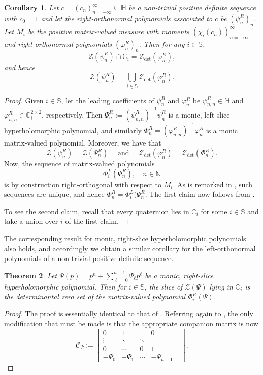 \documentclass[11pt,reqno]{amsart}
\def\x{\chi}
\def\p{\varphi}
\def\q{\psi}
\def\P{\Phi}
\def\Q{\Psi}
\def\NN{\mathbb{N}}
\def\CC{\mathbb{C}}
\def\SS{\mathbb{S}}
\def\HH{\mathbb{H}}
\def\cC{\mathcal{C}}
\def\cZ{\mathcal{Z}}
\newtheorem{theorem}{Theorem}[section]
\newtheorem{corollary}[theorem]{Corollary}
\theoremstyle{definition}
\numberwithin{equation}{section}
\begin{document}
\begin{corollary}
    \label{cor:rightPolyZeros}
    Let \(c = (c_n)_{n=-\infty}^{\infty} \subseteq \HH\) be a non-trivial positive definite sequence with \(c_0 = 1\) and let the right-orthonormal polynomials associated to \(c\) be \((\q_n^R)_n\). Let \(M_i\) be the positive matrix-valued measure with moments \((\x_i(c_n))_{n=-\infty}^{\infty}\) and right-orthonormal polynomials \((\p_n^R)_n\). Then for any \(i \in \SS\),
    \[
        \cZ(\q_n^R) \cap \CC_i = \cZ_{\det}(\p_n^R),
    \]
    and hence
    \[
        \cZ(\q_n^R) = \bigcup_{i \in \SS} \cZ_{\det}(\p_n^R).
    \]
\end{corollary}
\begin{proof}
    Given \(i \in \SS\), let the leading coefficients of \(\q_n^R\) and \(\p_n^R\) be \(\q_{n,n}^R \in \HH\) and \(\p_{n,n}^R \in \CC_i^{2\times 2}\), respectively. Then \(\Q_n^R := (\q_{n,n}^R)^{-1}\q_n^R\) is a monic, left-slice hyperholomorphic polynomial, and similarly \(\P_n^R = (\p_{n,n}^R)^{-1}\p_n^R\) is a monic matrix-valued polynomial. Moreover, we have that
    \[
        \cZ(\q_n^R) = \cZ(\Q_n^R) \quad \text{ and } \quad \cZ_{\det}(\p_n^R) = \cZ_{\det}(\P_n^R).
    \]
    Now, the sequence of matrix-valued polynomials
    \[
        \P_i^L(\Q_n^R), \quad n \in \NN
    \]
    is by construction right-orthogonal with respect to \(M_i\). As is remarked in \cite{DPS08}, such sequences are unique, and hence \(\P_n^R = \P_i^L(\Q_n^R\). The first claim now follows from .

    To see the second claim, recall that every quaternion lies in \(\CC_i\) for some \(i \in \SS\) and take a union over \(i\) of the first claim.
\end{proof}

The corresponding result for monic, right-slice hyperholomorphic polynomials also holds, and accordingly we obtain a similar corollary for the left-orthonormal polynomials of a non-trivial positive definite sequence.

\begin{theorem}
    \label{thm:rightZeroSet}
    Let \(\Q(p) = p^n + \sum_{\ell = 0}^{n-1} \Q_\ell p^\ell\) be a monic, right-slice hyperholomorphic polynomial. Then for \(i \in \SS\), the slice of \(\cZ(\Q)\) lying in \(\CC_i\) is the determinantal zero set of the matrix-valued polynomial \(\P^R_i(\Q)\).
\end{theorem}
\begin{proof}
    The proof is essentially identical to that of . Referring again to \cite[Proposition 1]{SPV01}, the only modification that must be made is that the appropriate companion matrix is now
    \[
        \cC_\Q := \begin{bmatrix}
            0 & 1 & & 0 \\ \vdots & \ddots & \ddots & & \\ 0 & \cdots & 0 & 1 \\ -\Q_0 & -\Q_1 & \cdots & -\Q_{n-1}
        \end{bmatrix}.
    \]
\end{proof}
\end{document}
